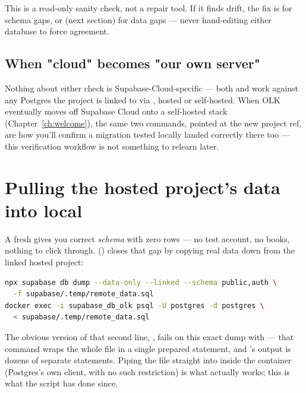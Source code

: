 \begin{olknote}
This is a read-only sanity check, not a repair tool. If it finds drift, the fix is  for schema gaps, or  (next section) for data gaps — never hand-editing either database to force agreement.
\end{olknote}

\subsection{When "cloud" becomes "our own server"}
\label{sec:cloud-becomes-server}

Nothing about either check is Supabase-Cloud-specific — both  and  work against any Postgres the project is linked to via , hosted or self-hosted. When OLK eventually moves off Supabase Cloud onto a self-hosted stack (Chapter~\ref{ch:welcome}), the same two commands, pointed at the new project ref, are how you'll confirm a migration tested locally landed correctly there too — this verification workflow is not something to relearn later.

\section{Pulling the hosted project's data into local}
\label{sec:pull-data}

A fresh  gives you correct \emph{schema} with zero rows — no test account, no books, nothing to click through.  () closes that gap by copying real data down from the linked hosted project:

\begin{lstlisting}[style=olkcodebash, language=bash, caption={scripts/pull-remote-data.sh — the whole script}]
npx supabase db dump --data-only --linked --schema public,auth \
  -f supabase/.temp/remote_data.sql
docker exec -i supabase_db_olk psql -U postgres -d postgres \
  < supabase/.temp/remote_data.sql
\end{lstlisting}

\begin{olkgotcha}
The obvious version of that second line, , fails on this exact dump with  — that command wraps the whole file in a single prepared statement, and 's output is dozens of separate statements. Piping the file straight into  inside the  container (Postgres's own client, with no such restriction) is what actually works; this is what the script has done since.
\end{olkgotcha}

